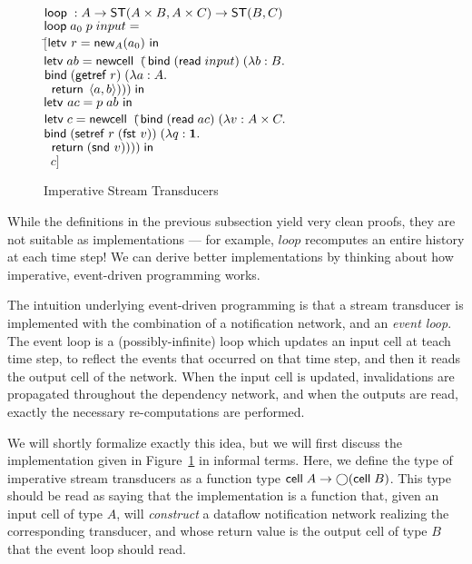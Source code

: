 \documentclass[preprint,natbib]{sigplanconf}
\begin{document}
\begin{figure}
\begin{tabbing}
$\mbox{\textsf{{loop}}}\; : A \to \mbox{\textsf{{ST}}}({A\times B}, {A\times C}) \to \mbox{\textsf{{ST}}}({B}, {C})$ \\
$\mbox{\textsf{{loop}}}\; a_0\; p \; input = $ \\
\;\;$[$\=$\mbox{\textsf{{letv }}}r = \mbox{\textsf{{new}}}_{A}(a_0)\mbox{\textsf{{ in }}}$ \\
    \>$\mbox{\textsf{{letv}}}\; ab = \mbox{\textsf{{newcell}}}\;\; ($\=$\mbox{\textsf{{bind}}}\; (\mbox{\textsf{{read}}}\; input)\; (\lambda b:B.$ \\
    \>                                \>$\mbox{\textsf{{bind}}}\; (\mbox{\textsf{{getref}}}\; r)\;       (\lambda a:A.$ \\
    \>                                \>$\;\; \mbox{\textsf{{return}}}\; \left<{a},{b}\right>))) \;\mbox{\textsf{{in}}}$ \\
    \>$\mbox{\textsf{{letv }}}ac = p\;ab\mbox{\textsf{{ in }}}$ \\
    \>$\mbox{\textsf{{letv}}}\;c = \mbox{\textsf{{newcell}}}\;\; ($\=$\mbox{\textsf{{bind}}}\; (\mbox{\textsf{{read}}}\; ac) \;(\lambda v:A \times C.$ \\
    \>                              \>$\mbox{\textsf{{bind}}}\; (\mbox{\textsf{{setref}}}\; r\;(\mbox{\textsf{{fst }}} v)) \;(\lambda q:\mathbf{1}.$ \\
    \>                              \>$\;\;\mbox{\textsf{{return}}}\; (\mbox{\textsf{{snd }}} v))))\;\mbox{\textsf{{in}}}$ \\
    \>$\;\;c]$ 
\end{tabbing}
\caption{Imperative Stream Transducers}
\label{imperative-transducer-semantics}
\end{figure}

While the definitions in the previous subsection yield very clean
proofs, they are not suitable as implementations --- for example,
$loop$ recomputes an entire history at each time step! We can derive
better implementations by thinking about how imperative, event-driven
programming works.

The intuition underlying event-driven programming is that a stream
transducer is implemented with the combination of a notification
network, and an \emph{event loop}.  The event loop is a
(possibly-infinite) loop which updates an input cell at teach time
step, to reflect the events that occurred on that time step, and then
it reads the output cell of the network. When the input cell is
updated, invalidations are propagated throughout the dependency
network, and when the outputs are read, exactly the necessary
re-computations are performed.

We will shortly formalize exactly this idea, but we will first discuss
the implementation given in
Figure~\ref{imperative-transducer-semantics} in informal terms. Here,
we define the type of imperative stream transducers as a function type
$\mbox{\textsf{{cell}}}\;{A} \to \bigcirc{(\mbox{\textsf{{cell}}}\;{B})}$. This type should be read as
saying that the implementation is a function that, given an input cell
of type $A$, will \emph{construct} a dataflow notification network
realizing the corresponding transducer, and whose return value is the
output cell of type $B$ that the event loop should read. 
\end{document}
